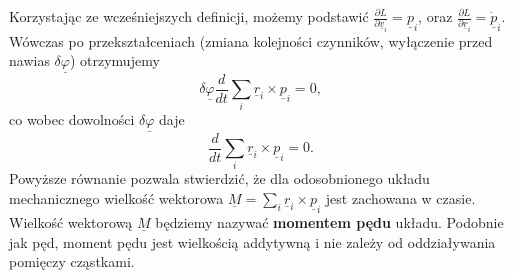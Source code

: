 \documentclass[12pt,a4paper,openright]{report} %
\begin{document}
Korzystając ze wcześniejszych definicji, możemy podstawić $\frac{\partial L}{\partial \underline{v}_i}=\underline{p}_i$, oraz $ \frac{\partial L}{\partial \underline{r}_i} = \dot{\underline{p}}_i$. Wówczas po przekształceniach (zmiana kolejności czynników, wyłączenie przed nawias $\delta \underline{\varphi}$) otrzymujemy
\begin{equation}
\delta \underline{\varphi} \frac{d}{dt}\sum \limits_{i} \underline{r}_i \times \underline{p}_i =0,
\end{equation}
co wobec dowolności $\delta \underline{\varphi}$ daje
\begin{equation}
\frac{d}{dt}\sum \limits_{i} \underline{r}_i \times \underline{p}_i =0.
\end{equation}
Powyższe równanie pozwala stwierdzić, że dla odosobnionego układu mechanicznego wielkość wektorowa $\underline{M}=\sum \limits_{i} \underline{r}_i \times \underline{p}_i$ jest zachowana w czasie. Wielkość wektorową $\underline{M}$ będziemy nazywać \textbf{momentem pędu} układu. Podobnie jak pęd, moment pędu jest wielkością addytywną i nie zależy od oddziaływania pomięczy cząstkami.
\\
\end{document}
